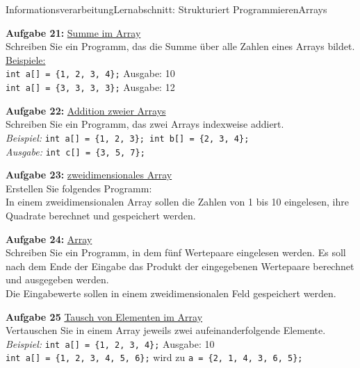 \documentclass[oneside,openany,headings=optiontotoc,11pt,numbers=noenddot]{scrreprt}
\begin{document}
	\begin{worksheet}{Informationsverarbeitung}{Lernabschnitt: Strukturiert Programmieren}{Arrays}
		\noindent
		\sffamily
		\begin{framed}
			\noindent
			\textbf{Aufgabe 21:} \underline{Summe im Array}\\
			Schreiben Sie ein Programm, das die Summe über alle Zahlen eines Arrays bildet.\\
			\underline{Beispiele:}\\
			\lstinline[style=JavaInputStyle]|int a[] = {1, 2, 3, 4};| Ausgabe: 10\\
			\lstinline[style=JavaInputStyle]|int a[] = {3, 3, 3, 3};| Ausgabe: 12\\
			\par\noindent
			\textbf{Aufgabe 22:} \underline{Addition zweier Arrays}\\
			Schreiben Sie ein Programm, das zwei Arrays indexweise addiert.\\
			\textit{Beispiel:} \lstinline[style=JavaInputStyle]|int a[] = {1, 2, 3}; int b[] = {2, 3, 4};|\\
			\textit{Ausgabe:} \lstinline[style=JavaInputStyle]|int c[] = {3, 5, 7};|\\
			\par\noindent
			\textbf{Aufgabe 23:} \underline{zweidimensionales Array}\\
			Erstellen Sie folgendes Programm:\\
			In einem zweidimensionalen Array sollen die Zahlen von 1 bis 10 eingelesen, ihre Quadrate berechnet und gespeichert werden.\\
			\par\noindent
			\textbf{Aufgabe 24:} \underline{Array}\\
			Schreiben Sie ein Programm, in dem fünf Wertepaare eingelesen werden. Es soll nach dem Ende der Eingabe das Produkt der eingegebenen Wertepaare berechnet und ausgegeben werden.\\
			Die Eingabewerte sollen in einem zweidimensionalen Feld gespeichert werden.\\
			\par\noindent
			\textbf{Aufgabe 25} \underline{Tausch von Elementen im Array}\\
			Vertauschen Sie in einem Array jeweils zwei aufeinanderfolgende Elemente.\\
			\textit{Beispiel:} \lstinline[style=JavaInputStyle]|int a[] = {1, 2, 3, 4};| Ausgabe: 10\\
			\lstinline[style=JavaInputStyle]|int a[] = {1, 2, 3, 4, 5, 6};| wird zu \lstinline[style=JavaInputStyle]|a = {2, 1, 4, 3, 6, 5};|\\

\end{framed}
\end{worksheet}
\end{document}
